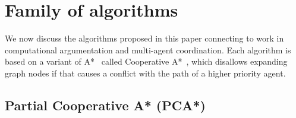 \section{Family of algorithms}\label{sec:method}
We now discuss the algorithms proposed in this paper connecting to work in 
computational argumentation and multi-agent coordination. Each algorithm is 
based on a variant of A*~\cite{hart1968} called Cooperative 
A*~\cite{silver2005}, which disallows expanding graph nodes if that 
causes a conflict with the path of a higher priority agent.


\subsection{Partial Cooperative A* (PCA*)}

